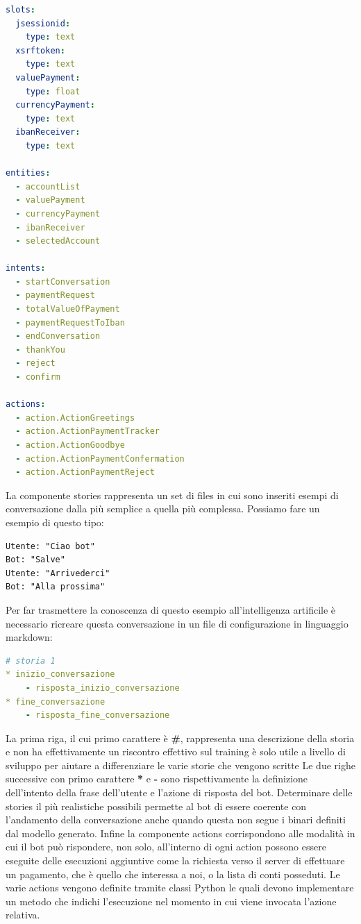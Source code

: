 \begin{lstlisting}[language=yaml,firstnumber=1]
slots:
  jsessionid:
    type: text
  xsrftoken:
    type: text
  valuePayment:
    type: float
  currencyPayment:
    type: text
  ibanReceiver:
    type: text

entities:
  - accountList
  - valuePayment
  - currencyPayment
  - ibanReceiver
  - selectedAccount

intents:
  - startConversation
  - paymentRequest
  - totalValueOfPayment
  - paymentRequestToIban
  - endConversation
  - thankYou
  - reject
  - confirm

actions:
  - action.ActionGreetings
  - action.ActionPaymentTracker
  - action.ActionGoodbye
  - action.ActionPaymentConfermation
  - action.ActionPaymentReject
\end{lstlisting}
La componente stories rappresenta un set di files in cui sono inseriti esempi di conversazione dalla più semplice a quella più complessa. Possiamo fare un esempio di questo tipo:
\begin{lstlisting}
Utente: "Ciao bot"
Bot: "Salve"
Utente: "Arrivederci"
Bot: "Alla prossima"
\end{lstlisting}
Per far trasmettere la conoscenza di questo esempio all'intelligenza artificile è necessario ricreare questa conversazione in un file di configurazione in linguaggio markdown:
\begin{lstlisting}[language=yaml]
# storia 1
* inizio_conversazione
    - risposta_inizio_conversazione
* fine_conversazione
    - risposta_fine_conversazione
\end{lstlisting}
La prima riga, il cui primo carattere è \textbf{\#}, rappresenta una descrizione della storia e non ha effettivamente un riscontro effettivo sul training è solo utile a livello di sviluppo per aiutare a differenziare le varie storie che vengono scritte
Le due righe successive con primo carattere \textbf{*} e \textbf{-} sono rispettivamente la definizione dell'intento della frase dell'utente e l'azione di risposta del bot.
Determinare delle stories il più realistiche possibili permette al bot di essere coerente con l'andamento della conversazione anche quando questa non segue i binari definiti dal modello generato.
Infine la componente actions corrispondono alle modalità in cui il bot può rispondere, non solo, all'interno di ogni action possono essere eseguite delle esecuzioni aggiuntive come la richiesta verso il server di effettuare un pagamento, che è quello che interessa a noi, o la lista di conti posseduti. 
Le varie actions vengono definite tramite classi Python le quali devono implementare un metodo che indichi l'esecuzione nel momento in cui viene invocata l'azione relativa.
